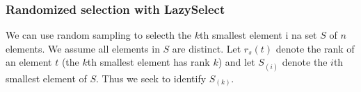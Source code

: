 




\subsubsection{Randomized selection with LazySelect}
We can use random sampling to selecth the $k$th smallest element i na set $S$ of
$n$ elements. We assume all elements in $S$ are distinct. Let $r_s(t)$ denote
the rank of an element $t$ (the $k$th smallest element has rank $k$) and let
$S_{(i)}$ denote the $i$th smallest element of $S$. Thus we seek to identify
$S_{(k)}$.



